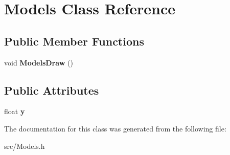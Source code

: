 \hypertarget{class_models}{\section{Models Class Reference}
\label{class_models}
}
\subsection*{Public Member Functions}
\begin{DoxyCompactItemize}
\item 
\hypertarget{class_models_ad04102fde8b617095c1b124166083698}{void {\bfseries Models\-Draw} ()}\label{class_models_ad04102fde8b617095c1b124166083698}

\end{DoxyCompactItemize}
\subsection*{Public Attributes}
\begin{DoxyCompactItemize}
\item 
\hypertarget{class_models_a216bd71f0a133ff9349b5e656f7d8f80}{float {\bfseries y}}\label{class_models_a216bd71f0a133ff9349b5e656f7d8f80}

\end{DoxyCompactItemize}


The documentation for this class was generated from the following file\-:\begin{DoxyCompactItemize}
\item 
src/Models.\-h\end{DoxyCompactItemize}
